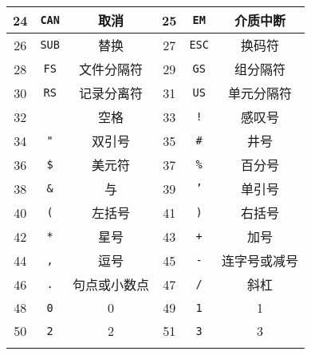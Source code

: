 \begin{longtable}{|c|c|c|c|c|c|}
            \hline \rule{0pt}{15pt}
            24   & \texttt{CAN}       & 取消              	& 25   & \texttt{EM}        & 介质中断        	\\
            \hline \rule{0pt}{15pt}
            26   & \texttt{SUB}       & 替换              	& 27   & \texttt{ESC}       & 换码符           	\\
            \hline \rule{0pt}{15pt}
            28   & \texttt{FS}        & 文件分隔符     	& 29   & \texttt{GS}        & 组分隔符        	\\
            \hline \rule{0pt}{15pt}
            30   & \texttt{RS}        & 记录分离符     	& 31   & \texttt{US}        & 单元分隔符     	\\
            \hline \rule{0pt}{15pt}
            32   &          & 空格              	& 33   & \texttt{!}         & 感叹号           	\\
            \hline \rule{0pt}{15pt}
            34   & \texttt{"}         & 双引号           	& 35   & \texttt{\#}         & 井号              	\\
            \hline \rule{0pt}{15pt}
            36   & \texttt{\$}         & 美元符           	& 37   & \texttt{\%}         & 百分号           	\\
            \hline \rule{0pt}{15pt}
            38   & \texttt{\&}         & 与                 	& 39   & \texttt{'}         & 单引号           	\\
            \hline \rule{0pt}{15pt}
            40   & \texttt{(}         & 左括号           	& 41   & \texttt{)}         & 右括号           	\\
            \hline \rule{0pt}{15pt}
            42   & \texttt{*}         & 星号              	& 43   & \texttt{+}         & 加号              	\\
            \hline \rule{0pt}{15pt}
            44   & \texttt{,}         & 逗号              	& 45   & \texttt{-}         & 连字号或减号  	\\
            \hline \rule{0pt}{15pt}
            46   & \texttt{.}         & 句点或小数点  	& 47   & \texttt{/}         & 斜杠              	\\
            \hline \rule{0pt}{15pt}
            48   & \texttt{0}         & 0                   	& 49   & \texttt{1}         & 1                   	\\
            \hline \rule{0pt}{15pt}
            50   & \texttt{2}         & 2                   	& 51   & \texttt{3}         & 3                   	\\
            \hline \rule{0pt}{15pt}

\end{longtable}
